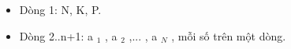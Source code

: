 \begin{itemize}
	\item     Dòng 1: N, K, P.   
	\item     Dòng 2..n+1: a    $_     1    $    , a    $_     2    $    ,... , a    $_     N    $    , mỗi số trên một dòng.   
\end{itemize}

\